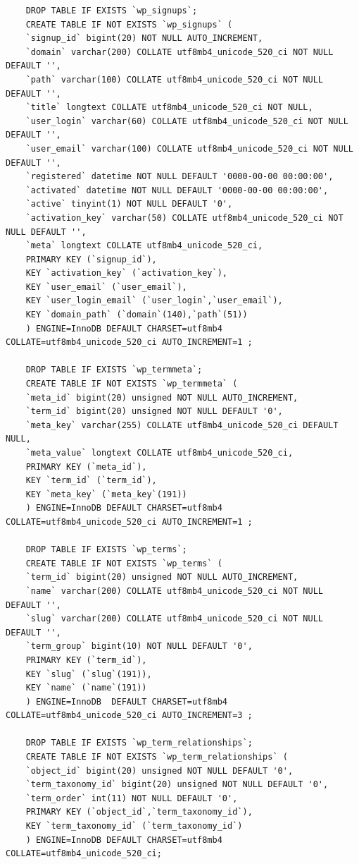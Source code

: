 \documentclass[10pt,a4paper]{article}
\begin{document}
\begin{lstlisting}
	DROP TABLE IF EXISTS `wp_signups`;
	CREATE TABLE IF NOT EXISTS `wp_signups` (
	`signup_id` bigint(20) NOT NULL AUTO_INCREMENT,
	`domain` varchar(200) COLLATE utf8mb4_unicode_520_ci NOT NULL DEFAULT '',
	`path` varchar(100) COLLATE utf8mb4_unicode_520_ci NOT NULL DEFAULT '',
	`title` longtext COLLATE utf8mb4_unicode_520_ci NOT NULL,
	`user_login` varchar(60) COLLATE utf8mb4_unicode_520_ci NOT NULL DEFAULT '',
	`user_email` varchar(100) COLLATE utf8mb4_unicode_520_ci NOT NULL DEFAULT '',
	`registered` datetime NOT NULL DEFAULT '0000-00-00 00:00:00',
	`activated` datetime NOT NULL DEFAULT '0000-00-00 00:00:00',
	`active` tinyint(1) NOT NULL DEFAULT '0',
	`activation_key` varchar(50) COLLATE utf8mb4_unicode_520_ci NOT NULL DEFAULT '',
	`meta` longtext COLLATE utf8mb4_unicode_520_ci,
	PRIMARY KEY (`signup_id`),
	KEY `activation_key` (`activation_key`),
	KEY `user_email` (`user_email`),
	KEY `user_login_email` (`user_login`,`user_email`),
	KEY `domain_path` (`domain`(140),`path`(51))
	) ENGINE=InnoDB DEFAULT CHARSET=utf8mb4 COLLATE=utf8mb4_unicode_520_ci AUTO_INCREMENT=1 ;
	
	DROP TABLE IF EXISTS `wp_termmeta`;
	CREATE TABLE IF NOT EXISTS `wp_termmeta` (
	`meta_id` bigint(20) unsigned NOT NULL AUTO_INCREMENT,
	`term_id` bigint(20) unsigned NOT NULL DEFAULT '0',
	`meta_key` varchar(255) COLLATE utf8mb4_unicode_520_ci DEFAULT NULL,
	`meta_value` longtext COLLATE utf8mb4_unicode_520_ci,
	PRIMARY KEY (`meta_id`),
	KEY `term_id` (`term_id`),
	KEY `meta_key` (`meta_key`(191))
	) ENGINE=InnoDB DEFAULT CHARSET=utf8mb4 COLLATE=utf8mb4_unicode_520_ci AUTO_INCREMENT=1 ;
	
	DROP TABLE IF EXISTS `wp_terms`;
	CREATE TABLE IF NOT EXISTS `wp_terms` (
	`term_id` bigint(20) unsigned NOT NULL AUTO_INCREMENT,
	`name` varchar(200) COLLATE utf8mb4_unicode_520_ci NOT NULL DEFAULT '',
	`slug` varchar(200) COLLATE utf8mb4_unicode_520_ci NOT NULL DEFAULT '',
	`term_group` bigint(10) NOT NULL DEFAULT '0',
	PRIMARY KEY (`term_id`),
	KEY `slug` (`slug`(191)),
	KEY `name` (`name`(191))
	) ENGINE=InnoDB  DEFAULT CHARSET=utf8mb4 COLLATE=utf8mb4_unicode_520_ci AUTO_INCREMENT=3 ;
	
	DROP TABLE IF EXISTS `wp_term_relationships`;
	CREATE TABLE IF NOT EXISTS `wp_term_relationships` (
	`object_id` bigint(20) unsigned NOT NULL DEFAULT '0',
	`term_taxonomy_id` bigint(20) unsigned NOT NULL DEFAULT '0',
	`term_order` int(11) NOT NULL DEFAULT '0',
	PRIMARY KEY (`object_id`,`term_taxonomy_id`),
	KEY `term_taxonomy_id` (`term_taxonomy_id`)
	) ENGINE=InnoDB DEFAULT CHARSET=utf8mb4 COLLATE=utf8mb4_unicode_520_ci;
	

\end{lstlisting}
\end{document}
